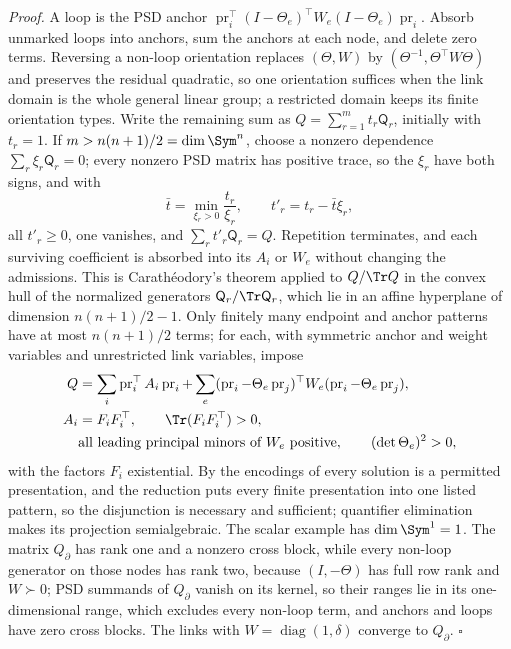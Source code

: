\noindent\emph{Proof.}
A loop is the PSD anchor
\(\operatorname{pr}_i^\top(I-\Theta_e)^\top W_e(I-\Theta_e)\operatorname{pr}_i\).
Absorb unmarked loops into anchors, sum the anchors at each node, and delete zero
terms. Reversing a non-loop orientation replaces \((\Theta,W)\) by
\((\Theta^{-1},\Theta^\top W\Theta)\) and preserves the residual quadratic, so
one orientation suffices when the link domain is the whole general linear group;
a restricted domain keeps its finite orientation types. Write the remaining sum
as \(Q=\sum_{r=1}^mt_r\mathsf Q_r\), initially with \(t_r=1\). If
\(m>n(n+1)/2=\dim\Sym^n\), choose a nonzero dependence
\(\sum_r\xi_r\mathsf Q_r=0\); every nonzero PSD matrix has positive trace, so the
\(\xi_r\) have both signs, and with
\begin{equation}
\bar t=\min_{\xi_r>0}\frac{t_r}{\xi_r},
\qquad t'_r=t_r-\bar t\xi_r,
\label{eq:cg-finite-pair-support-reduction}
\end{equation}
all \(t'_r\geq0\), one vanishes, and \(\sum_rt'_r\mathsf Q_r=Q\). Repetition
terminates, and each surviving coefficient is absorbed into its \(A_i\) or
\(W_e\) without changing the admissions. This is Carath\'eodory's theorem
\citep[Thm.~17.1]{Rockafellar1970} applied to \(Q/\Tr Q\) in the convex hull of
the normalized generators \(\mathsf Q_r/\Tr\mathsf Q_r\), which lie in an affine
hyperplane of dimension \(n(n+1)/2-1\). Only finitely many endpoint and anchor
patterns have at most \(n(n+1)/2\) terms; for each, with symmetric anchor and
weight variables and unrestricted link variables, impose
\begin{equation}
\begin{aligned}
Q&=\sum_i\operatorname{pr}_i^\top A_i\operatorname{pr}_i+\sum_e
(\operatorname{pr}_i-\Theta_e\operatorname{pr}_j)^\top W_e(\operatorname{pr}_i-\Theta_e\operatorname{pr}_j),\\
A_i&=F_iF_i^\top,\qquad
\Tr(F_iF_i^\top)>0,\\
&\text{all leading principal minors of }W_e\text{ positive},
\qquad(\det\Theta_e)^2>0,
\end{aligned}
\label{eq:cg-finite-pair-polynomial-system}
\end{equation}
with the factors \(F_i\) existential. By the encodings of
 every solution is a permitted presentation,
and the reduction puts every finite presentation into one listed pattern, so the
disjunction is necessary and sufficient; quantifier elimination makes its
projection semialgebraic. The scalar example has \(\dim\Sym^1=1\). The matrix
\(Q_\partial\) has rank one and a nonzero cross block, while every non-loop
generator on those nodes has rank two, because \((I,-\Theta)\) has full row rank
and \(W\succ0\); PSD summands of \(Q_\partial\) vanish on its kernel, so their
ranges lie in its one-dimensional range, which excludes every non-loop term, and
anchors and loops have zero cross blocks. The links with
\(W=\operatorname{diag}(1,\delta)\) converge to \(Q_\partial\). \(\square\)

